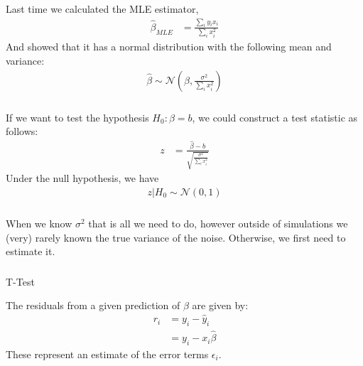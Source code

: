 \begin{frame}[fragile] \frametitle{}

Last time we calculated the MLE estimator,
\begin{align*}
\widehat{\beta}_{MLE} &= \frac{\sum_i y_i x_i}{\sum_i x_i^2}
\end{align*}
\pause And showed that it has a normal distribution with the following
mean and variance:
\begin{align*}
\widehat{\beta} \sim \mathcal{N} (\beta, \frac{\sigma^2}{\sum_i x_i^2})
\end{align*}

\end{frame}

\begin{frame}[fragile] \frametitle{}

If we want to test the hypothesis $H_0: \beta = b$, we
could construct a test statistic as follows: \pause
\begin{align*}
z &= \frac{\widehat{\beta} - b}{\sqrt{\frac{\sigma^2}{\sum_i x_i^2}}}
\end{align*}
\pause Under the null hypothesis, we have
\begin{align*}
z | H_0  \sim \mathcal{N} (0, 1)
\end{align*}

\end{frame}

\begin{frame}[fragile] \frametitle{}

When we know $\sigma^2$ that is all we need to do, however
outside of simulations we (very) rarely known the true variance
of the noise. Otherwise, we first need to estimate it.

\end{frame}

\begin{frame}[fragile] \frametitle{}

{\color{yaleblue}\fontsize{16pt}{20pt}\selectfont T-Test}

The residuals from a given prediction of $\beta$ are given by:
\begin{align*}
r_i &= y_i - \widehat{y}_i \\
&= y_i - x_i \widehat{\beta}
\end{align*}
These represent an estimate of the error terms $\epsilon_i$.

\end{frame}

